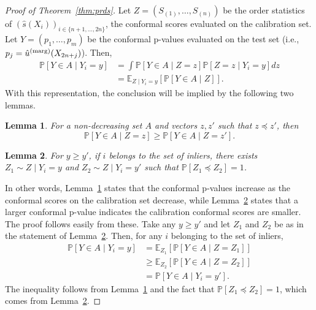 \documentclass[11pt]{article}
\newtheorem{lemma}{Lemma}
\def\E{\mathbb{E}}
\def\marg{\textnormal{(marg)}}
\renewcommand{\P}{\mathbb{P}}
\begin{document}
\begin{proof}[Proof of Theorem~\ref{thm:prds}]
Let $Z = (S_{(1)},\dots,S_{(n)})$ be the order statistics of $(\hat{s}(X_i))_{i \in \{n+1,\dots,2n\}}$, the conformal scores evaluated on the calibration set.  Let $Y = (p_1,\dots,p_m)$ be the conformal p-values evaluated on the test set (i.e., $p_j = \hat{u}^\marg(X_{2n+j})$). Then,
\begin{align*}
    \P\left[ Y \in A \mid Y_i = y \right] &= \int \P\left[ Y \in A \mid Z = z\right] \P\left[Z = z \mid Y_i = y\right] dz \\
    &= \E_{Z \mid Y_i = y}\left[ \P\left[ Y \in A \mid Z\right] \right].
\end{align*}
With this representation, the conclusion will be implied by the following two lemmas.

\begin{lemma} \label{lem:prds1}
For a non-decreasing set $A$ and vectors $z, z'$ such that $z \preceq z'$, then 
\begin{equation*}
    \P\left[ Y \in A \mid Z = z \right] \ge \P \left[ Y \in A \mid Z = z' \right].
\end{equation*}
\end{lemma}

\begin{lemma} \label{lem:prds2}
For $y \ge y'$, if $i$ belongs to the set of inliers, there exists $Z_1 \sim Z \mid Y_i = y$ and $Z_2 \sim Z \mid Y_i = y'$ such that $\P\left[Z_1 \preceq Z_2\right] = 1$. 
\end{lemma}

In other words, Lemma~\ref{lem:prds1} states that the conformal p-values increase as the conformal scores on the calibration set decrease, while Lemma~\ref{lem:prds2} states that a larger conformal p-value indicates the calibration conformal scores are smaller.
The proof follows easily from these. Take any $y \ge y'$ and let $Z_1$ and $Z_2$ be as in the statement of Lemma~\ref{lem:prds2}. Then, for any $i$ belonging to the set of inliers,
\begin{align*}
\P\left[ Y \in A \mid Y_i = y \right] 
    &= \E_{Z_1}\left[\P\left[ Y \in A \mid Z = Z_1\right] \right] \\
    &\ge \E_{Z_2}\left[\P\left[ Y \in A \mid Z = Z_2 \right] \right] \\
    &= \P\left[Y \in A \mid Y_i = y'\right].
\end{align*}
The inequality follows from Lemma~\ref{lem:prds1} and the fact that $\P\left[ Z_1 \preceq Z_2 \right] = 1$, which comes from Lemma~\ref{lem:prds2}.
\end{proof}
\end{document}
